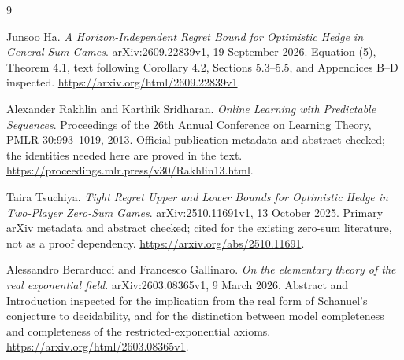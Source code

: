 \documentclass[11pt]{article}
\begin{document}
\begin{thebibliography}{9}
\raggedright
{}
Junsoo Ha. \emph{A Horizon-Independent Regret Bound for Optimistic Hedge in
General-Sum Games}. arXiv:2609.22839v1, 19 September 2026.
Equation (5), Theorem 4.1, text following Corollary 4.2, Sections 5.3--5.5,
and Appendices B--D inspected.
\url{https://arxiv.org/html/2609.22839v1}.

Alexander Rakhlin and Karthik Sridharan.
\emph{Online Learning with Predictable Sequences}.
Proceedings of the 26th Annual Conference on Learning Theory,
PMLR 30:993--1019, 2013. Official publication metadata and abstract checked;
the identities needed here are proved in the text.
\url{https://proceedings.mlr.press/v30/Rakhlin13.html}.

Taira Tsuchiya. \emph{Tight Regret Upper and Lower Bounds for Optimistic
Hedge in Two-Player Zero-Sum Games}. arXiv:2510.11691v1,
13 October 2025. Primary arXiv metadata and abstract checked; cited for
the existing zero-sum literature, not as a proof dependency.
\url{https://arxiv.org/abs/2510.11691}.

Alessandro Berarducci and Francesco Gallinaro.
\emph{On the elementary theory of the real exponential field}.
arXiv:2603.08365v1, 9 March 2026. Abstract and Introduction inspected for
the implication from the real form of Schanuel's conjecture to
decidability, and for the distinction between model completeness and
completeness of the restricted-exponential axioms.
\url{https://arxiv.org/html/2603.08365v1}.
\end{thebibliography}
\end{document}
